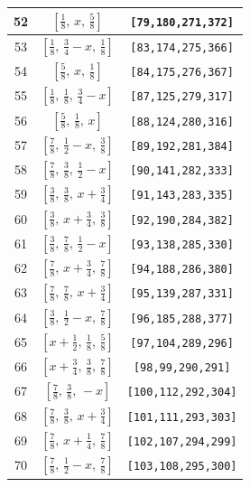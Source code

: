 \documentclass[fleqn,8pt]{jsarticle}
\begin{document}
\begin{longtable}{ccc}
52 & $\left[ \frac{1}{8},\, x,\, \frac{5}{8} \right]$ & {\tt [79,180,271,372]} \\ \hline
53 & $\left[ \frac{1}{8},\, \frac{3}{4} - x,\, \frac{1}{8} \right]$ & {\tt [83,174,275,366]} \\ \hline
54 & $\left[ \frac{5}{8},\, x,\, \frac{1}{8} \right]$ & {\tt [84,175,276,367]} \\ \hline
55 & $\left[ \frac{1}{8},\, \frac{1}{8},\, \frac{3}{4} - x \right]$ & {\tt [87,125,279,317]} \\ \hline
56 & $\left[ \frac{5}{8},\, \frac{1}{8},\, x \right]$ & {\tt [88,124,280,316]} \\ \hline
57 & $\left[ \frac{7}{8},\, \frac{1}{2} - x,\, \frac{3}{8} \right]$ & {\tt [89,192,281,384]} \\ \hline
58 & $\left[ \frac{7}{8},\, \frac{3}{8},\, \frac{1}{2} - x \right]$ & {\tt [90,141,282,333]} \\ \hline
59 & $\left[ \frac{3}{8},\, \frac{3}{8},\, x + \frac{3}{4} \right]$ & {\tt [91,143,283,335]} \\ \hline
60 & $\left[ \frac{3}{8},\, x + \frac{3}{4},\, \frac{3}{8} \right]$ & {\tt [92,190,284,382]} \\ \hline
61 & $\left[ \frac{3}{8},\, \frac{7}{8},\, \frac{1}{2} - x \right]$ & {\tt [93,138,285,330]} \\ \hline
62 & $\left[ \frac{7}{8},\, x + \frac{3}{4},\, \frac{7}{8} \right]$ & {\tt [94,188,286,380]} \\ \hline
63 & $\left[ \frac{7}{8},\, \frac{7}{8},\, x + \frac{3}{4} \right]$ & {\tt [95,139,287,331]} \\ \hline
64 & $\left[ \frac{3}{8},\, \frac{1}{2} - x,\, \frac{7}{8} \right]$ & {\tt [96,185,288,377]} \\ \hline
65 & $\left[ x + \frac{1}{2},\, \frac{1}{8},\, \frac{5}{8} \right]$ & {\tt [97,104,289,296]} \\ \hline
66 & $\left[ x + \frac{3}{4},\, \frac{3}{8},\, \frac{7}{8} \right]$ & {\tt [98,99,290,291]} \\ \hline
67 & $\left[ \frac{7}{8},\, \frac{3}{8},\, - x \right]$ & {\tt [100,112,292,304]} \\ \hline
68 & $\left[ \frac{7}{8},\, \frac{3}{8},\, x + \frac{3}{4} \right]$ & {\tt [101,111,293,303]} \\ \hline
69 & $\left[ \frac{7}{8},\, x + \frac{1}{4},\, \frac{7}{8} \right]$ & {\tt [102,107,294,299]} \\ \hline
70 & $\left[ \frac{7}{8},\, \frac{1}{2} - x,\, \frac{7}{8} \right]$ & {\tt [103,108,295,300]} \\ \hline

\end{longtable}
\end{document}
